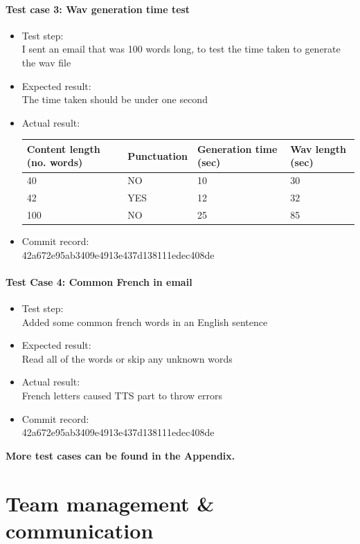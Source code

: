 \documentclass{article}
\begin{document}
\paragraph{Test case 3: Wav generation time test}
\begin{itemize}
\item Test step: \\
    I sent an email that was 100 words long, to test the time taken to generate the wav file
\item Expected result: \\
    The time taken should be under one second
\item Actual result: \\
    \begin{tabular}{|l|l|l|l|} 
    \hline Content length (no. words) & Punctuation & Generation time (sec) & Wav length (sec) \\ 
    \hline 40 & NO & 10 & 30 \\
    \hline 42 & YES & 12 & 32 \\
    \hline 100 & NO & 25 & 85 \\
    \hline
    \end{tabular}
\item Commit record: \\
    42a672e95ab3409e4913e437d138111edec408de
\end{itemize}

\paragraph{Test Case 4: Common French in email}
\begin{itemize}
\item Test step: \\
    Added some common french words in an English sentence
\item Expected result: \\
    Read all of the words or skip any unknown words
\item Actual result: \\
    French letters caused TTS part to throw errors
\item Commit record: \\
    42a672e95ab3409e4913e437d138111edec408de
\end{itemize}

\textbf{More test cases can be found in the Appendix.}



\section{Team management \& communication}
\end{document}
